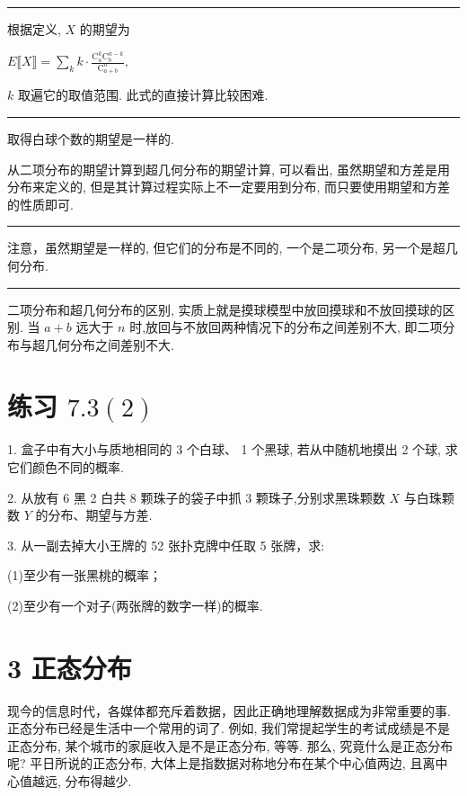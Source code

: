 \documentclass[10pt]{article}
\newcommand{\HRule}{\begin{center}\rule{0.9\linewidth}{0.2mm}\end{center}}
\begin{document}
\section*{}

\HRule

根据定义, \(X\) 的期望为

\(E\llbracket X\rrbracket  = \mathop{\sum }\limits_{k}k \cdot  \frac{{\mathrm{C}}_{a}^{k}{\mathrm{C}}_{b}^{n - k}}{{\mathrm{C}}_{a + b}^{n}},\)

\(k\) 取遍它的取值范围. 此式的直接计算比较困难.

\HRule

取得白球个数的期望是一样的.

从二项分布的期望计算到超几何分布的期望计算, 可以看出, 虽然期望和方差是用分布来定义的, 但是其计算过程实际上不一定要用到分布, 而只要使用期望和方差的性质即可.

\HRule

注意，虽然期望是一样的, 但它们的分布是不同的, 一个是二项分布, 另一个是超几何分布.

\HRule

二项分布和超几何分布的区别, 实质上就是摸球模型中放回摸球和不放回摸球的区别. 当 \(a + b\) 远大于 \(n\) 时,放回与不放回两种情况下的分布之间差别不大, 即二项分布与超几何分布之间差别不大.

\section*{练习 \({7.3}\left( 2\right)\)}

1. 盒子中有大小与质地相同的 3 个白球、 1 个黑球, 若从中随机地摸出 2 个球, 求它们颜色不同的概率.

2. 从放有 6 黑 2 白共 8 颗珠子的袋子中抓 3 颗珠子,分别求黑珠颗数 \(X\) 与白珠颗数 \(Y\) 的分布、期望与方差.

3. 从一副去掉大小王牌的 52 张扑克牌中任取 5 张牌，求:

(1)至少有一张黑桃的概率；

(2)至少有一个对子(两张牌的数字一样)的概率.

\section*{3 正态分布}

现今的信息时代，各媒体都充斥着数据，因此正确地理解数据成为非常重要的事. 正态分布已经是生活中一个常用的词了. 例如, 我们常提起学生的考试成绩是不是正态分布, 某个城市的家庭收入是不是正态分布, 等等. 那么, 究竟什么是正态分布呢? 平日所说的正态分布, 大体上是指数据对称地分布在某个中心值两边, 且离中心值越远, 分布得越少.
\end{document}

